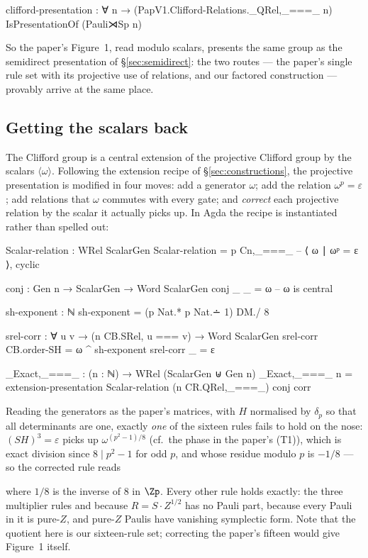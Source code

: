 \begin{agdacode}
clifford-presentation :
  ∀ n → (PapV1.Clifford-Relations._QRel,_===_ n) IsPresentationOf (Pauli⋊Sp n)
\end{agdacode}

So the paper's Figure~1, read modulo scalars, presents the same group as
the semidirect presentation of \S\ref{sec:semidirect}: the two routes ---
the paper's single rule set with its projective use of relations, and
our factored construction --- provably arrive at the same place.

\subsection{Getting the scalars back}\label{sec:scalars}

The Clifford group is a central extension of the projective Clifford
group by the scalars $\langle\omega\rangle$.  Following the extension
recipe of \S\ref{sec:constructions}, the projective presentation is
modified in four moves: add a generator $\omega$; add the relation
$\omega^{p} = \varepsilon$; add relations that $\omega$ commutes with
every gate; and \emph{correct} each projective relation by the scalar it
actually picks up.  In Agda the recipe is instantiated rather than
spelled out:

\begin{agdacode}
Scalar-relation : WRel ScalarGen
Scalar-relation = p Cn,_===_                 -- ⟨ ω ∣ ωᵖ = ε ⟩, cyclic

conj : Gen n → ScalarGen → Word ScalarGen
conj _ _ = ω                                 -- ω is central

sh-exponent : ℕ
sh-exponent = (p Nat.* p Nat.∸ 1) DM./ 8

srel-corr : ∀ {u v} → (n CB.SRel, u === v) → Word ScalarGen
srel-corr CB.order-SH = ω ^ sh-exponent
srel-corr _           = ε

_Exact,_===_ : (n : ℕ) → WRel (ScalarGen ⊎ Gen n)
_Exact,_===_ n =
  extension-presentation Scalar-relation (n CR.QRel,_===_) conj corr
\end{agdacode}

Reading the generators as the paper's matrices, with $H$ normalised by
$\delta_p$ so that all determinants are one, exactly \emph{one} of the
sixteen rules fails to hold on the nose: $(SH)^3 = \varepsilon$ picks
up $\omega^{(p^2-1)/8}$ (cf.\ the phase in the paper's (T1)), which is
exact division since $8 \mid p^2 - 1$ for odd $p$, and whose residue
modulo $p$ is $-1/8$ --- so the corrected rule reads
\begin{center}
\end{center}
where $1/8$ is the inverse of $8$ in $\Zp$.  Every other rule holds
exactly: the three multiplier rules and  because $R = S
\cdot Z^{1/2}$ has no Pauli part,  because every Pauli in
it is pure-$Z$, and pure-$Z$ Paulis have vanishing symplectic form.  Note that the quotient here is
our sixteen-rule set; correcting the paper's fifteen would give
Figure~1 itself.

